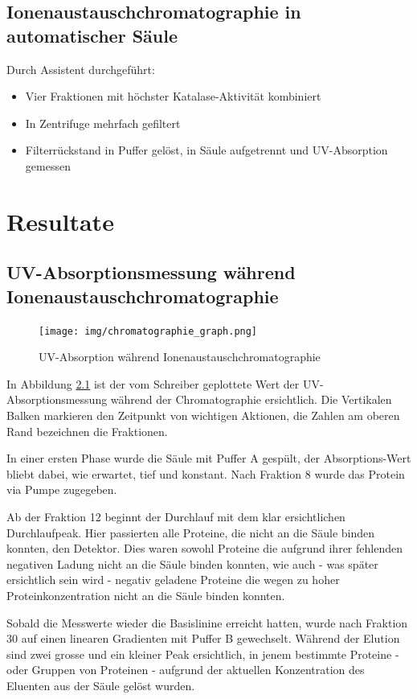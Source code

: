 \documentclass[a4paper,german]{scrreprt}
\begin{document}
\section{Ionenaustauschchromatographie in automatischer Säule}

Durch Assistent durchgeführt:

\begin{itemize}
	\item Vier Fraktionen mit höchster Katalase-Aktivität kombiniert
	\item In Zentrifuge mehrfach gefiltert
	\item Filterrückstand in Puffer gelöst, in Säule aufgetrennt und
		UV-Absorption gemessen
\end{itemize}

\chapter{Resultate}

\section{UV-Absorptionsmessung während Ionenaustauschchromatographie}

\begin{figure}[h]
	\centering
	\texttt{[image: img/chromatographie\_graph.png]}
	\caption{UV-Absorption während Ionenaustauschchromatographie}
	\label{fig:chrom_graph}
\end{figure}

In Abbildung \ref{fig:chrom_graph} ist der vom Schreiber geplottete Wert der
UV-Absorptionsmessung während der Chromatographie ersichtlich. Die Vertikalen
Balken markieren den Zeitpunkt von wichtigen Aktionen, die Zahlen am oberen
Rand bezeichnen die Fraktionen.

In einer ersten Phase wurde die Säule mit Puffer A gespült, der
Absorptions-Wert bliebt dabei, wie erwartet, tief und konstant. Nach Fraktion 8
wurde das Protein via Pumpe zugegeben.

Ab der Fraktion 12 beginnt der Durchlauf mit dem klar ersichtlichen
Durchlaufpeak. Hier passierten alle Proteine, die nicht an die Säule binden
konnten, den Detektor. Dies waren sowohl Proteine die aufgrund ihrer fehlenden
negativen Ladung nicht an die Säule binden konnten, wie auch - was später
ersichtlich sein wird - negativ geladene Proteine die wegen zu hoher
Proteinkonzentration nicht an die Säule binden konnten.

Sobald die Messwerte wieder die Basislinine erreicht hatten, wurde nach
Fraktion 30 auf einen linearen Gradienten mit Puffer B gewechselt. Während der
Elution sind zwei grosse und ein kleiner Peak ersichtlich, in jenem bestimmte
Proteine - oder Gruppen von Proteinen - aufgrund der aktuellen Konzentration
des Eluenten aus der Säule gelöst wurden.
\end{document}

